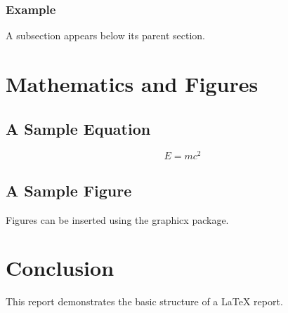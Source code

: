 \documentclass[12pt,a4paper]{report}
\begin{document}
\subsection{Example}
A subsection appears below its parent section.

\chapter{Mathematics and Figures}
\section{A Sample Equation}
\[
E=mc^2
\]

\section{A Sample Figure}
Figures can be inserted using the graphicx package.

\chapter{Conclusion}
This report demonstrates the basic structure of a LaTeX report.
\end{document}
